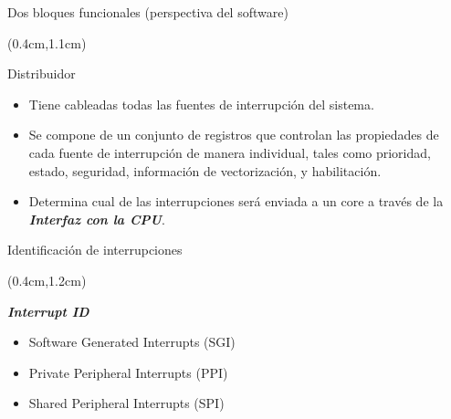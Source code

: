 \documentclass[usenames,table,xcolor={x11names},aspectratio=169]{beamer}
\begin{document}
\begin{frame}[t]{Dos bloques funcionales (perspectiva del software)}
 \begin{textblock*}{\textwidth}(0.4cm,1.1cm)
  \begin{block}{Distribuidor}
   \begin{itemize}[<+(1)->]\justifying
    \item Tiene cableadas todas las fuentes de interrupción del sistema. 
    \item Se compone de un conjunto de registros que controlan las propiedades de cada fuente de interrupción de manera individual, tales como prioridad, estado, seguridad, información de vectorización, y habilitación.
    \item Determina cual de las interrupciones será enviada a un core a través de la \textbf{\textit{Interfaz con la CPU}}.  
   \end{itemize}
  \end{block}
 \end{textblock*}
\end{frame}

\begin{frame}[t]{Identificación de interrupciones}
 \begin{textblock*}{\textwidth}(0.4cm,1.2cm)
  \begin{block}{\textbf{\textit{Interrupt ID}}}\justifying
   
   
  \end{block}
  \parskip 0.3cm
  \begin{itemize}[<+(5)->]\parskip 0.3cm
   \item Software Generated Interrupts (SGI)
   \item Private Peripheral Interrupts (PPI)
   \item Shared Peripheral Interrupts (SPI)
  \end{itemize}
 \end{textblock*}
\end{frame}
\end{document}

